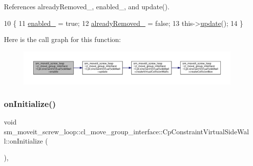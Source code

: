 References already\+Removed\+\_\+, enabled\+\_\+, and update().


\begin{DoxyCode}
10         \{
11             \hyperlink{classsm__moveit__screw__loop_1_1cl__move__group__interface_1_1CpConstraintVirtualSideWall_a3ad858929f75175c5c7955b76bb095ec}{enabled\_} = \textcolor{keyword}{true};
12             \hyperlink{classsm__moveit__screw__loop_1_1cl__move__group__interface_1_1CpConstraintVirtualSideWall_a5a48090196dffd58a81f2d6cf77e2405}{alreadyRemoved\_} = \textcolor{keyword}{false};
13             this->\hyperlink{classsm__moveit__screw__loop_1_1cl__move__group__interface_1_1CpConstraintVirtualSideWall_a4582ad379597080236133d0f354f694e}{update}();
14         \}
\end{DoxyCode}
Here is the call graph for this function\+:
\nopagebreak
\begin{figure}[H]
\begin{center}
\leavevmode
\includegraphics[width=350pt]{classsm__moveit__screw__loop_1_1cl__move__group__interface_1_1CpConstraintVirtualSideWall_aac2558a634cbcd5d7738011af0d8210b_cgraph}
\end{center}
\end{figure}
\mbox{\label{classsm__moveit__screw__loop_1_1cl__move__group__interface_1_1CpConstraintVirtualSideWall_a34f0babfdf0304d34cd42e77800f1df0}} 
\subsubsection{\texorpdfstring{on\+Initialize()}{onInitialize()}}
{\footnotesize\ttfamily void sm\+\_\+moveit\+\_\+screw\+\_\+loop\+::cl\+\_\+move\+\_\+group\+\_\+interface\+::\+Cp\+Constraint\+Virtual\+Side\+Wall\+::on\+Initialize (\begin{DoxyParamCaption}{ }\end{DoxyParamCaption})\hspace{0.3cm}{\ttfamily [override]}, {\ttfamily [virtual]}}



